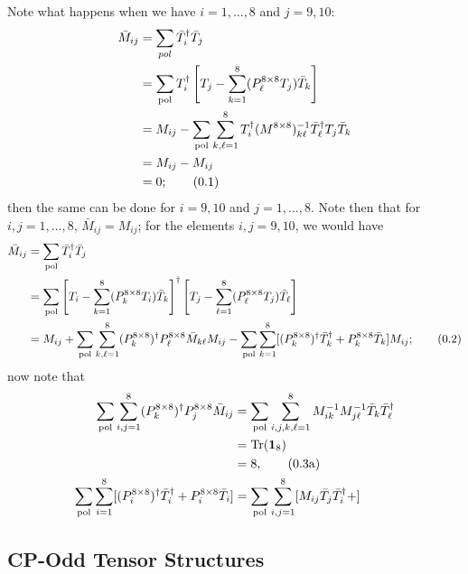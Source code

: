 \documentclass[12pt]{article}
\numberwithin{equation}{section}
\numberwithin{figure}{section}
\numberwithin{table}{section}
\newcommand{\numberthis}{\addtocounter{equation}{1}\tag{\theequation}}
\newcommand{\numberthisa}{\addtocounter{equation}{1}\tag{\theequation a}}
\renewcommand{\theequation}{\arabic{section}.\arabic{equation}}
\begin{document}
        Note what happens when we have \(i=1,\dots,8\) and \(j=9,10\): 
	\begin{align*}
	  \bar{M}_{ij} & =\sum_{pol}\bar{T}_i^\dagger\bar{T}_j\\
          & =\sum_\mathrm{pol}T_i^\dagger\left[T_j-\sum_{k=1}^8(P_\ell^{8\times 8}T_j)\bar{T}_k\right]\\
          & =M_{ij}-\sum_{\mathrm{pol}}\sum_{k,\ell=1}^8T_i^\dagger(M^{8\times 8})_{k\ell}^{-1}\bar{T}_\ell^\dagger T_j\bar{T}_k\\
          & =M_{ij}-M_{ij}\\
          & =0; \numberthis
	\end{align*}
        then the same can be done for \(i=9,10\) and \(j=1,\dots,8\). Note then that for \(i,j=1,\dots,8\), \(\bar{M}_{ij}=M_{ij}\); for the elements \(i,j=9,10\), we would have 
	\begin{align*}
	  \bar{M}_{ij} & =\sum_\mathrm{pol}\bar{T}_i^\dagger\bar{T}_j\\
          & =\sum_{\mathrm{pol}}\left[T_i-\sum_{k=1}^8(P_k^{8\times 8}T_i)\bar{T}_k\right]^\dagger\left[T_j-\sum_{\ell=1}^8(P_\ell^{8\times 8}T_j)\bar{T}_\ell\right]\\
          & =M_{ij}+\sum_{\mathrm{pol}}\sum_{k,\ell=1}^8(P_k^{8\times8})^\dagger P_\ell^{8\times 8}\bar{M}_{k\ell}M_{ij}-\sum_{\mathrm{pol}}\sum_{k=1}^8[(P_k^{8\times 8})^\dagger\bar{T}_k^\dagger+P_k^{8\times 8}\bar{T}_k] M_{ij}; \numberthis
	\end{align*}
        now note that 
	\begin{align*}
	  \sum_{\mathrm{pol}}\sum_{i,j=1}^8(P_k^{8\times 8})^\dagger P_j^{8\times 8}\bar{M}_{ij} & =\sum_{\mathrm{pol}}\sum_{i,j,k,\ell=1}^8M_{ik}^{-1}M_{j\ell}^{-1}\bar{T}_k\bar{T}_\ell^\dagger\\
          & =\Tr(\mathbf{1}_8)\\
          & =8, \numberthisa\\
          \sum_{\mathrm{pol}}\sum_{i=1}^8[(P_i^{8\times 8})^\dagger \bar{T}_i^\dagger+P_i^{8\times 8}\bar{T}_i] & =\sum_{\mathrm{pol}}\sum_{i,j=1}^8[M_{ij}\bar{T}_j\bar{T}_i^\dagger+]
	\end{align*}
        
	\subsection{CP-Odd Tensor Structures}
	
\end{document}
